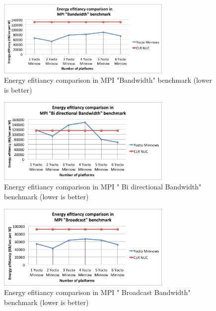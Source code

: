 \begin{figure}[H]
\centering
\includegraphics[width=0.75\textwidth]{images/energy_results/bandwidth.png}
\caption{Energy efitiancy comparison in MPI "Bandwidth" benchmark (lower is
better)}
\label{bandwidth_energy}
\end{figure}

\begin{figure}[H]
\centering
\includegraphics[width=0.75\textwidth]{images/energy_results/bibw.png}
\caption{Energy efitiancy comparison in MPI " Bi directional Bandwidth" benchmark (lower is
better)}
\label{bibw_energy}
\end{figure}


\begin{figure}[H]
\centering
\includegraphics[width=0.75\textwidth]{images/energy_results/broadcast.png}
\caption{Energy efitiancy comparison in MPI " Broadcast Bandwidth" benchmark (lower is
better)}
\label{broadcast_energy}
\end{figure}


\clearpage
